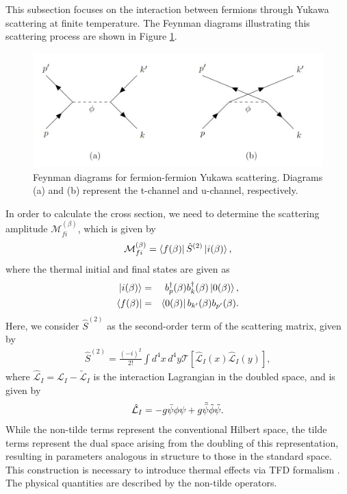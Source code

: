 \documentclass[11pt,showpacs,preprintnumbers,amsmath,amssymb,prd,nofootinbib,superscriptaddress]{revtex4-2}
\begin{document}
This subsection focuses on the interaction between fermions through Yukawa scattering at finite temperature. The Feynman diagrams illustrating this scattering process are shown in Figure \ref{fig1}.
\begin{figure}[!htb]
    \centering
    \includegraphics[scale=0.3]{diagrams.png}
    \caption{Feynman diagrams for fermion-fermion Yukawa scattering. Diagrams (a) and (b) represent the t-channel and u-channel, respectively.}
    \label{fig1}
\end{figure}
In order to calculate the cross section, we need to determine the scattering amplitude $\mathcal{M}_{fi}^{(\beta)}$, which is given by
\begin{eqnarray}
    \mathcal{M}_{fi}^{(\beta)}=\bra{f(\beta)}\hat{S}^{(2)}\ket{i(\beta)},
\end{eqnarray}
where the thermal initial and final states are given as
\begin{eqnarray}
    \ket{i(\beta)} &=& b^{\dagger}_p(\beta) b^{\dagger}_k(\beta) \ket{0(\beta)} ,\\
    \bra{f(\beta)} &=& \bra{0(\beta)} b_{{k}^\prime} (\beta)b_{{p}^\prime}(\beta)  .
\end{eqnarray}
Here, we consider $\hat{S}^{(2)}$ as the second-order term of the scattering matrix, given by
\begin{eqnarray}
    \hat{S}^{(2)}=\frac{(-i)^2}{2!}\int d^4x \, d^4y\mathcal{T}\left[\hat{\mathcal{L}}_I(x)\hat{\mathcal{L}}_I(y)\right],
\end{eqnarray}
where  $\hat{\mathcal{L}}_I=\mathcal{L}_I-\tilde{\mathcal{L}}_I$ is the interaction Lagrangian in the doubled space, and is given by
\begin{eqnarray}
    \hat{\mathcal{L}}_I=-g\Bar{\psi}\phi\psi+g\tilde{\bar{\psi}}\tilde{\phi}\tilde{\psi}.
\end{eqnarray}
While the non-tilde terms represent the conventional Hilbert space, the tilde terms represent the dual space arising from the doubling of this representation, resulting in parameters analogous in structure to those in the standard space. This construction is necessary to introduce thermal effects via TFD formalism \cite{temp000, khannatfd}. The physical quantities are described by the non-tilde operators.
\end{document}
